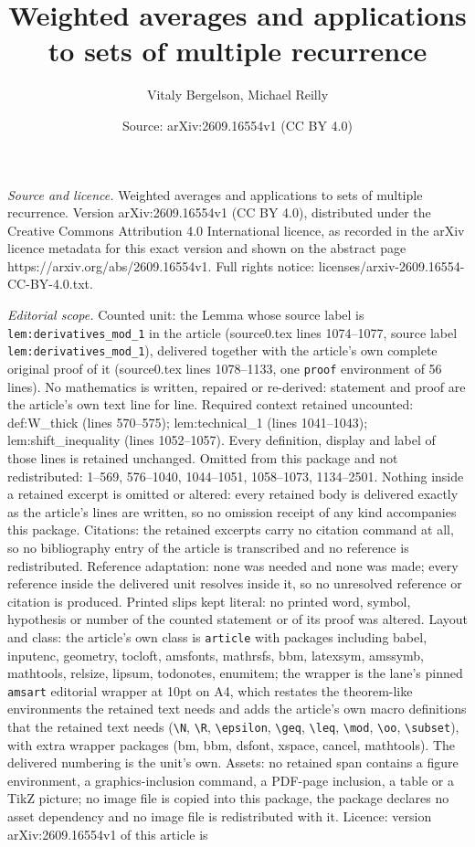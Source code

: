 \documentclass[10pt,a4paper]{amsart}
\title[Weighted averages and applications to sets of multiple recur]{Weighted averages and applications to sets of multiple recurrence}
\author{Vitaly Bergelson, Michael Reilly}
\date{Source: arXiv:2609.16554v1 (CC BY 4.0)}
\begin{document}
\maketitle

\noindent\emph{Source and licence.} Weighted averages and applications to sets of multiple recurrence. Version arXiv:2609.16554v1 (CC BY 4.0), distributed under the Creative Commons Attribution 4.0 International licence, as recorded in the arXiv licence metadata for this exact version and shown on the abstract page https://arxiv.org/abs/2609.16554v1. Full rights notice: licenses/arxiv-2609.16554-CC-BY-4.0.txt.\par\smallskip

\noindent\textit{Editorial scope.} Counted unit: the Lemma whose source label is \texttt{lem:derivatives\_mod\_1} in the article (source0.tex lines 1074--1077, source label \texttt{lem:derivatives\_mod\_1}), delivered together with the article's own complete original proof of it (source0.tex lines 1078--1133, one \texttt{proof} environment of 56 lines). No mathematics is written, repaired or re-derived: statement and proof are the article's own text line for line. Required context retained uncounted: def:W\_thick (lines 570--575); lem:technical\_1 (lines 1041--1043); lem:shift\_inequality (lines 1052--1057). Every definition, display and label of those lines is retained unchanged. Omitted from this package and not redistributed: 1--569, 576--1040, 1044--1051, 1058--1073, 1134--2501. Nothing inside a retained excerpt is omitted or altered: every retained body is delivered exactly as the article's lines are written, so no omission receipt of any kind accompanies this package. Citations: the retained excerpts carry no citation command at all, so no bibliography entry of the article is transcribed and no reference is redistributed. Reference adaptation: none was needed and none was made; every reference inside the delivered unit resolves inside it, so no unresolved reference or citation is produced. Printed slips kept literal: no printed word, symbol, hypothesis or number of the counted statement or of its proof was altered. Layout and class: the article's own class is \texttt{article} with packages including babel, inputenc, geometry, tocloft, amsfonts, mathrsfs, bbm, latexsym, amssymb, mathtools, relsize, lipsum, todonotes, enumitem; the wrapper is the lane's pinned \texttt{amsart} editorial wrapper at 10pt on A4, which restates the theorem-like environments the retained text needs and adds the article's own macro definitions that the retained text needs (\texttt{\textbackslash N}, \texttt{\textbackslash R}, \texttt{\textbackslash epsilon}, \texttt{\textbackslash geq}, \texttt{\textbackslash leq}, \texttt{\textbackslash mod}, \texttt{\textbackslash oo}, \texttt{\textbackslash subset}), with extra wrapper packages (bm, bbm, dsfont, xspace, cancel, mathtools). The delivered numbering is the unit's own. Assets: no retained span contains a figure environment, a graphics-inclusion command, a PDF-page inclusion, a table or a TikZ picture; no image file is copied into this package, the package declares no asset dependency and no image file is redistributed with it. Licence: version arXiv:2609.16554v1 of this article is 
\end{document}
